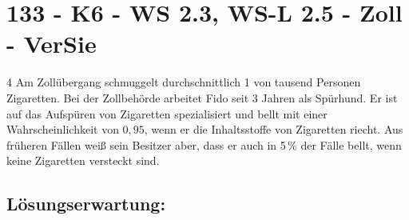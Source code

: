 \section{133 - K6 - WS 2.3, WS-L 2.5 - Zoll - VerSie}

\begin{langesbeispiel} \item[4] %
Am Zollübergang schmuggelt durchschnittlich 1 von tausend Personen Zigaretten. Bei der Zollbehörde arbeitet Fido seit 3 Jahren als Spürhund. Er ist auf das Aufspüren von Zigaretten spezialisiert und bellt mit einer Wahrscheinlichkeit von $0,95$, wenn er die Inhaltsstoffe von Zigaretten riecht. Aus früheren Fällen weiß sein Besitzer aber, dass er auch in 5\,\% der Fälle bellt, wenn keine Zigaretten versteckt sind.%

\begin{aufgabenstellung}
\item %


\item %


\end{aufgabenstellung}

\begin{loesung}
\item \subsection{Lösungserwartung:} 


\end{loesung}
\end{langesbeispiel}
